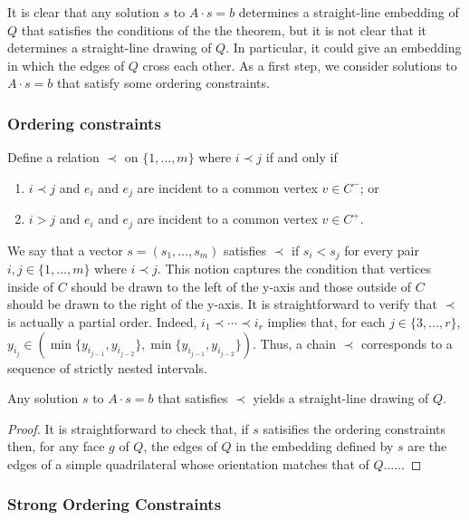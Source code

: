 \documentclass{patmorin}
\begin{document}
It is clear that any solution $s$ to $A\cdot s=b$ determines a straight-line
embedding of $Q$ that satisfies the conditions of the the theorem,
but it is not clear that it determines a straight-line drawing of $Q$.
In particular, it could give an embedding in which the edges of $Q$
cross each other.  As a first step, we consider solutions to $A\cdot s=b$
that satisfy some ordering constraints.

\subsubsection{Ordering constraints}

Define a relation $\prec$ on $\{1,\ldots,m\}$ where $i \prec j$
if and only if
\begin{enumerate}
  \item $i \prec j$ and $e_i$ and $e_j$ are incident to a common vertex
  $v\in C^-$; or
  \item $i > j$ and $e_i$ and $e_j$ are incident to a common vertex $v\in C^+$.
\end{enumerate}
We say that a vector $s=(s_1,\ldots,s_m)$ satisfies $\prec$ if $s_i <
s_j$ for every pair $i,j\in\{1,\ldots,m\}$ where $i\prec j$.  This notion
captures the condition that vertices inside of $C$ should be drawn to
the left of the y-axis and those outside of $C$ should be drawn to
the right of the y-axis.  It is straightforward to verify that $\prec$ 
is actually a partial order. Indeed, $i_1\prec \cdots
\prec i_r$ implies that, for each $j\in\{3,\ldots,r\}$, $y_{i_j}\in
(\min\{y_{i_{j-1}},y_{i_{j-2}}\}, \min\{y_{i_{j-1}},y_{i_{j-2}}\})$. Thus,
a chain $\prec$ corresponds to a sequence of strictly nested intervals.

\begin{lem}
   Any solution $s$ to $A\cdot s=b$ that satisfies $\prec$ yields a
   straight-line drawing of $Q$.
\end{lem}

\begin{proof}
It is straightforward to check that, if $s$ satisifies the ordering
constraints then, for any face $g$ of $Q$, the edges of $Q$ in the
embedding defined by $s$ are the edges of a simple quadrilateral whose
orientation matches that of $Q$......
\end{proof}


\subsubsection{Strong Ordering Constraints}
\end{document}
